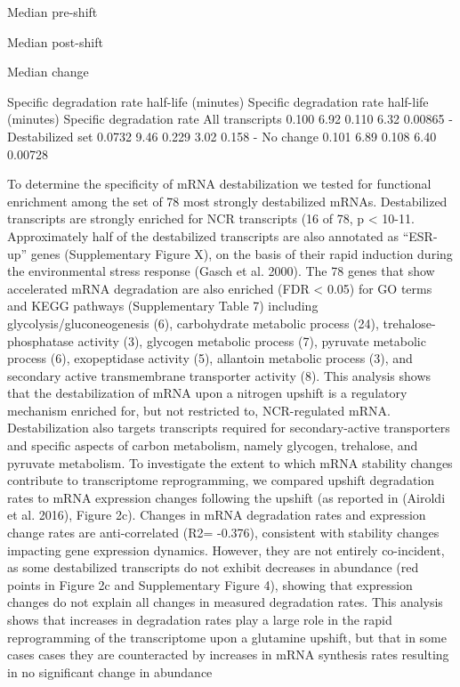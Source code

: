 	Median pre-shift
	

	Median post-shift
	

	Median change
	

	Specific degradation rate half-life (minutes) Specific degradation
rate half-life (minutes) Specific degradation rate All transcripts
0.100 6.92 0.110 6.32 0.00865 - Destabilized set 0.0732 9.46 0.229
3.02 0.158 - No change 0.101 6.89 0.108 6.40 0.00728 
	

To determine the specificity of mRNA destabilization we tested for
functional enrichment among the set of 78 most strongly destabilized
mRNAs. Destabilized transcripts are strongly enriched for NCR
transcripts (16 of  78, p < 10-11. Approximately half of the
destabilized transcripts are also annotated as “ESR-up” genes
(Supplementary Figure X), on the basis of  their rapid induction
during the environmental stress response (Gasch et al. 2000). The 78
genes that show accelerated mRNA degradation are also enriched (FDR <
0.05) for GO terms and KEGG pathways (Supplementary Table 7)
including glycolysis/gluconeogenesis (6), carbohydrate metabolic
process (24), trehalose-phosphatase activity (3), glycogen metabolic
process (7), pyruvate metabolic process (6), exopeptidase activity
(5), allantoin metabolic process (3), and secondary active
transmembrane transporter activity (8). This analysis shows that the
destabilization of mRNA upon a nitrogen upshift is a regulatory
mechanism enriched for, but not restricted to, NCR-regulated mRNA.
Destabilization also targets transcripts required for secondary-active
transporters and specific aspects of carbon metabolism, namely
glycogen, trehalose, and pyruvate metabolism.  To investigate the
extent to which mRNA stability changes contribute to transcriptome
reprogramming, we compared upshift degradation rates to mRNA
expression changes following the  upshift (as reported in (Airoldi et
al. 2016), Figure 2c). Changes in mRNA degradation rates and
expression change rates are anti-correlated (R2= -0.376), consistent
with stability changes impacting gene expression dynamics. However,
they are not entirely co-incident, as some destabilized transcripts do
not exhibit decreases in abundance (red points in Figure 2c and
Supplementary Figure 4), showing that expression changes do not
explain all changes in measured degradation rates. This analysis shows
that  increases in degradation rates play a large role in the rapid
reprogramming of the transcriptome upon a glutamine upshift, but that
in some cases cases they are counteracted by increases in mRNA
synthesis rates resulting in no significant change in abundance
